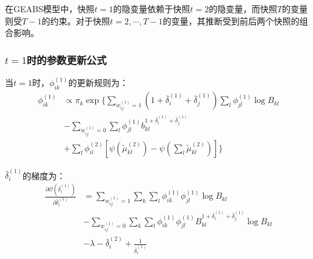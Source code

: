 
在GEABS模型中，快照$t=1$的隐变量依赖于快照$t=2$的隐变量，而快照$T$的变量则受$T-1$的约束。对于快照$t=2, \cdots, T-1$的变量，其推断受到前后两个快照的组合影响。
\subsubsection{$t=1$时的参数更新公式}
当$t=1$时，$\phi_{ik}^{(1)}$的更新规则为：
\begin{equation}
\begin{split}
\phi _{ik}^{(1)} & \propto \pi_k \exp\{ \sum_{w_{ij}^{(1)}=1} (1+\bar{\delta}_i^{(1)}+\bar{\delta}_j^{(1)}) \sum_l \phi_{jl}^{(1)} \log B_{kl} \\
& -\sum_{w_{ij}^{(1)}=0} \sum_l \phi_{jl}^{(1)}  b_{kl}^{1+\bar{\delta}_i^{(1)}+\bar{\delta}_j^{(1)}} \\
& + \sum_l \phi_{il}^{(2)}[\psi(\tilde{\mu}_{kl}^{(2)}) - \psi(\sum_l \tilde{\mu}_{kl}^{(2)})] \}
\end{split}
\end{equation}

$\bar{\delta}_i^{(1)}$的梯度为：
\begin{equation}
\begin{split}
\frac{\partial \mathscr{O}(\bar{\delta}_i^{(1)})}{\partial \bar{\delta}_i^{(1)}} & =\sum_{w_{ij}^{(1)}=1} \sum_k \sum_l \phi_{ik}^{(1)}\phi_{jl}^{(1)} \log B_{kl} \\
& -\sum_{w_{ij}^{(1)}=0} \sum_k \sum_l \phi_{ik}^{(1)}\phi_{jl}^{(1)}  B_{kl}^{1+\bar{\delta}_i^{(1)}+\bar{\delta}_j^{(1)}} \log B_{kl} \\
& -\lambda - \bar{\delta}_i^{(2)} + \frac{1}{\bar{\delta}_i^{(1)}}
\end{split}
\label{eq:delta1}
\end{equation}

